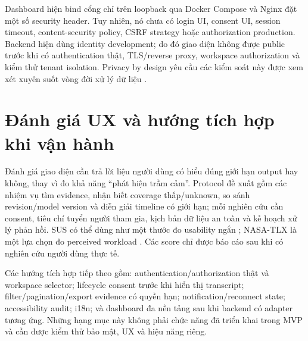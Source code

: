 Dashboard hiện bind cổng chỉ trên loopback qua Docker Compose và Nginx đặt một số security header. Tuy nhiên, nó chưa có login UI, consent UI, session timeout, content-security policy, CSRF strategy hoặc authorization production. Backend hiện dùng identity development; do đó giao diện không được public trước khi có authentication thật, TLS/reverse proxy, workspace authorization và kiểm thử tenant isolation. Privacy by design yêu cầu các kiểm soát này được xem xét xuyên suốt vòng đời xử lý dữ liệu \cite{cavoukian2011}.

\section{Đánh giá UX và hướng tích hợp khi vận hành}
Đánh giá giao diện cần trả lời liệu người dùng có hiểu đúng giới hạn output hay không, thay vì đo khả năng ``phát hiện trầm cảm''. Protocol đề xuất gồm các nhiệm vụ tìm evidence, nhận biết coverage thấp/unknown, so sánh revision/model version và diễn giải timeline có giới hạn; mỗi nghiên cứu cần consent, tiêu chí tuyển người tham gia, kịch bản dữ liệu an toàn và kế hoạch xử lý phản hồi. SUS có thể dùng như một thước đo usability ngắn \cite{brooke1996}; NASA-TLX là một lựa chọn đo perceived workload \cite{hart1988}. Các score chỉ được báo cáo sau khi có nghiên cứu người dùng thực tế.

Các hướng tích hợp tiếp theo gồm: authentication/authorization thật và workspace selector; lifecycle consent trước khi hiển thị transcript; filter/pagination/export evidence có quyền hạn; notification/reconnect state; accessibility audit; i18n; và dashboard đa nền tảng sau khi backend có adapter tương ứng. Những hạng mục này không phải chức năng đã triển khai trong MVP và cần được kiểm thử bảo mật, UX và hiệu năng riêng.
